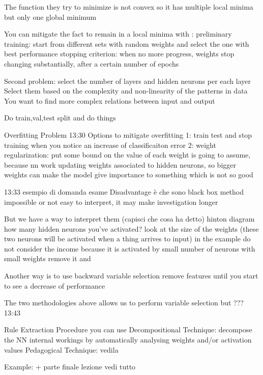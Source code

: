             The function they try to minimize is not convex so it has multiple local minima but only one global minimum

            You can mitigate the fact to remain in a local minima with :
                preliminary training: start from different sets with random weights and select the one with best performance 
                stopping criterion: when no more progress, weights stop changing substantially, after a certain number of epochs 
        
        Second problem: select the number of layers and hidden neurons per each layer 
            Select them based on the complexity and non-linearity of the patterns in data 
            You want to find more complex relations between input and output 

            Do train,val,test split and do things 

        Overfitting Problem 
            13:30
            Options to mitigate overfitting 
             1: train test and stop training when you notice an increase of classificaiton error 
             2: weight regularization: put some bound on the value of each weight is going to assume, because 
                                        nn work updating weights associated to hidden neurons, so bigger weights can 
                                        make the model give importance to something which is not so good 
        
        13:33 esempio di domanda esame 
        Disadvantage è che sono black box method 
            impossible or not easy to interpret, it may make investigation longer 

            But we have a way to interpret them (capisci che cosa ha detto)
                hinton diagram 
                    how many hidden neurons you've activated?
                    look at the size of the weights (these two neurons will be activated when a thing arrives to input)
                    in the example do not consider the income because it is activated by small number of neurons with small weights
                    remove it and 

                Another way is to use backward variable selection 
                remove features until you start to see a decrease of performance 

                The two methodologies above allows us to perform variable selection 
                but ??? 13:43

            Rule Extraction Procedure 
                you can use 
                Decompositional Technique: decompose the NN internal workings by automatically analysing weights and/or activation values 
                Pedagogical Technique: vedila 

                Example:
                    + parte finale lezione vedi tutto 

                    

\fi


        








